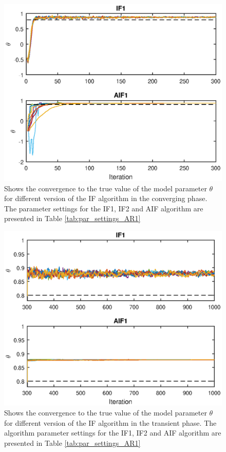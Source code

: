 \documentclass[twoside,openright]{report}
\begin{document}
\begin{figure}[h]
  \centering
    \includegraphics[width=1\textwidth]{./fig_simple_AR1/conv_theta_conv}
  \caption{Shows the convergence to the true value of the model parameter $\theta$ for different version of the IF algorithm  in the converging phase. The parameter settings for the IF1, IF2 and AIF algorithm are presented in Table \ref{tab:par_settings_AR1}}
  \label{fig:conv_theta_conv}
\end{figure}

\begin{figure}[h]
  \centering
    \includegraphics[width=1\textwidth]{./fig_simple_AR1/conv_theta_trans}
  \caption{Shows the convergence to the true value of the model parameter $\theta$ for different version of the IF algorithm in the transient phase. The algorithm parameter settings for the IF1, IF2 and AIF algorithm are presented in Table \ref{tab:par_settings_AR1}}
  \label{fig:conv_theta_trans}
\end{figure}
\end{document}
